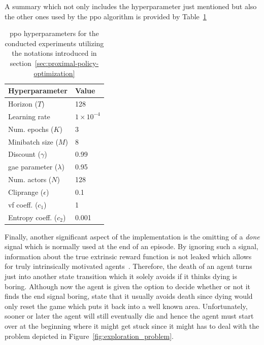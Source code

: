 \documentclass[draft,final]{vutinfth} %
\begin{document}
    A summary which not only includes the hyperparameter just mentioned but also the other ones used by the \gls{ppo} algorithm is provided by Table~\ref{tab:ppo_params}

    \begin{table}[h]
        \centering
        \begin{tabular}{|l|l|}
            \hline
            Hyperparameter                         & Value              \\
            \hline
            Horizon ($T$)                        & 128                \\
            Learning rate                        & $1 \times 10^{-4}$ \\
            Num. epochs  ($K$)                     & 3                  \\
            Minibatch size ($M$)                 & 8                  \\
            Discount ($\gamma$)                  & 0.99               \\
            \acrshort{gae} parameter ($\lambda$) & 0.95               \\
            Num. actors ($N$)                    & 128                \\
            Cliprange ($\epsilon$)               & 0.1                \\
            \acrshort{vf} coeff. ($c_1$)         & 1                  \\
            Entropy coeff. ($c_2$)               & 0.001              \\
            \hline
        \end{tabular}
        \caption[\gls{ppo} hyperparameters for the conducted experiments]{\gls{ppo} hyperparameters for the conducted experiments utilizing the notations introduced in section~\ref{sec:proximal-policy-optimization}}
        \label{tab:ppo_params}
    \end{table}

    Finally, another significant aspect of the implementation is the omitting of a \textit{done} signal which is normally used at the end of an episode.
    By ignoring such a signal, information about the true extrinsic reward function is not leaked which allows for truly intrinsically motivated agents~\citep{burda_large-scale_2018-1}.
    Therefore, the death of an agent turns just into another state transition which it solely avoids if it thinks dying is boring.
    Although now the agent is given the option to decide whether or not it finds the end signal boring, \citeauthor{burda_large-scale_2018-1} state that it usually avoids death since dying would only reset the game which puts it back into a well known area.
    Unfortunately, sooner or later the agent will still eventually die and hence the agent must start over at the beginning where it might get stuck since it might has to deal with the problem depicted in Figure~\ref{fig:exploration_problem}.
\end{document}
